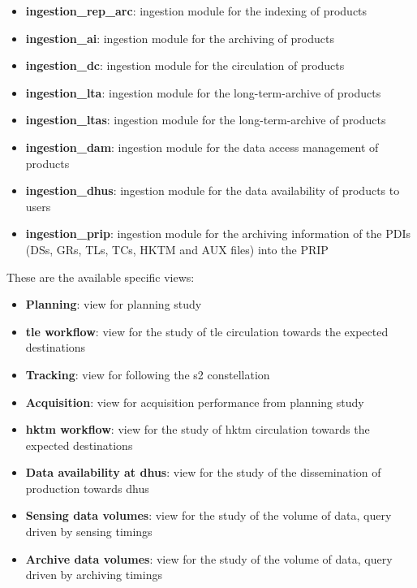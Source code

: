 \begin{itemize}
\item \textbf{ingestion\_rep\_arc}: ingestion module for the indexing of products

\item \textbf{ingestion\_ai}: ingestion module for the archiving of products

\item \textbf{ingestion\_dc}: ingestion module for the circulation of products

\item \textbf{ingestion\_lta}: ingestion module for the long-term-archive of products

\item \textbf{ingestion\_ltas}: ingestion module for the long-term-archive of products

\item \textbf{ingestion\_dam}: ingestion module for the data access management of products

\item \textbf{ingestion\_dhus}: ingestion module for the data availability of products to users

\item \textbf{ingestion\_prip}: ingestion module for the archiving information of the PDIs (DSs, GRs, TLs, TCs, HKTM and AUX files) into the PRIP

\end{itemize}

These are the available specific views:

\begin{itemize} 

\item \textbf{Planning}: view for planning study

\item \textbf{\acrshort{tle} workflow}: view for the study of \acrshort{tle} circulation towards the expected destinations

\item \textbf{Tracking}: view for following the \acrshort{s2} constellation
  
\item \textbf{Acquisition}: view for acquisition performance from planning study

\item \textbf{\acrshort{hktm} workflow}: view for the study of \acrshort{hktm} circulation towards the expected destinations

\item \textbf{Data availability at \acrshort{dhus}}: view for the study of the dissemination of production towards \acrshort{dhus}

\item \textbf{Sensing data volumes}: view for the study of the volume of data, query driven by sensing timings

\item \textbf{Archive data volumes}: view for the study of the volume of data, query driven by archiving timings
  
\end{itemize}

